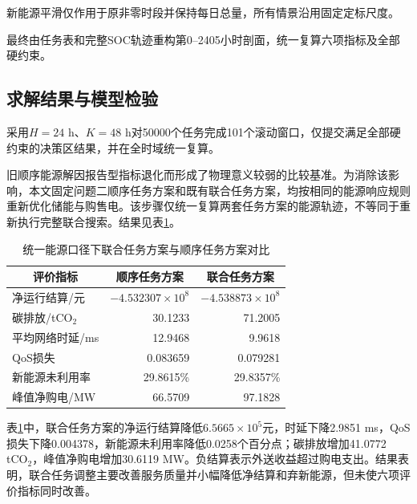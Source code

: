 新能源平滑仅作用于原非零时段并保持每日总量，所有情景沿用固定定标尺度。

最终由任务表和完整SOC轨迹重构第0--2405小时剖面，统一复算六项指标及全部硬约束。

\subsection{求解结果与模型检验}

采用$H=24$ h、$K=48$ h对50000个任务完成101个滚动窗口，仅提交满足全部硬约束的决策区结果，并在全时域统一复算。

旧顺序能源解因报告型指标退化而形成了物理意义较弱的比较基准。为消除该影响，本文固定问题二顺序任务方案和既有联合任务方案，均按相同的能源响应规则重新优化储能与购售电。该步骤仅统一复算两套任务方案的能源轨迹，不等同于重新执行完整联合搜索。结果见表\ref{tab:q4_result}。

\begin{table}[H]
	\centering
	\caption{统一能源口径下联合任务方案与顺序任务方案对比}
	\label{tab:q4_result}
	
	\fontsize{10.5pt}{12pt}\selectfont
	\renewcommand{\arraystretch}{0.90}
	
	\begin{tabular}{lrr}
		\toprule
		\multicolumn{1}{c}{\textbf{评价指标}}
		& \multicolumn{1}{c}{\textbf{顺序任务方案}}
	& \multicolumn{1}{c}{\textbf{联合任务方案}}\\
		\midrule
		
		净运行结算/元
		& $-4.532307\times10^8$
		& $-4.538873\times10^8$\\
		
		碳排放/tCO$_2$
		& 30.1233
		& 71.2005\\
		
		平均网络时延/ms
		& 12.9468
		& 9.9618\\
		
		QoS损失
		& 0.083659
		& 0.079281\\
		
		新能源未利用率
		& 29.8615\%
		& 29.8357\%\\
		
		峰值净购电/MW
		& 66.5709
		& 97.1828\\
		
		\bottomrule
	\end{tabular}
\end{table}


表\ref{tab:q4_result}中，联合任务方案的净运行结算降低$6.5665\times10^5$元，时延下降2.9851 ms，QoS损失下降0.004378，新能源未利用率降低0.0258个百分点；碳排放增加41.0772 tCO$_2$，峰值净购电增加30.6119 MW。负结算表示外送收益超过购电支出。结果表明，联合任务调整主要改善服务质量并小幅降低净结算和弃新能源，但未使六项评价指标同时改善。

